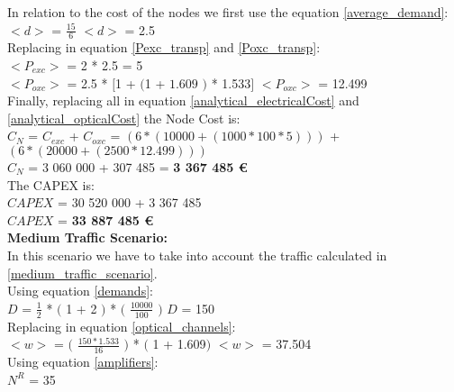 In relation to the cost of the nodes we first use the equation \ref{average_demand}:\\

$<d>$ = $\frac{15}{6}$ \qquad \qquad $<d>$ = 2.5\\

Replacing in equation \ref{Pexc_transp} and \ref{Poxc_transp}:\\

$<P_{exc}>$ = 2 * 2.5 = 5\\

$<P_{oxc}>$ = 2.5 * $[$1 + $($1 + $1.609$ $)$ * 1.533$]$ \qquad \quad $<P_{oxc}>$ = 12.499 \\

Finally, replacing all in equation \ref{analytical_electricalCost} and \ref{analytical_opticalCost} the Node Cost is:\\

$C_N$ = $C_{exc}$ + $C_{oxc}$ = $\left( 6*(10 000 + (1 000 * 100 * 5 ) ) \right)$ + $\left(6*(20 000 + (2 500 * 12.499 ) ) \right)$\\

$C_N$ = 3 060 000 + 307 485 = \textbf{3 367 485 \euro}\\

The CAPEX is:\\
$CAPEX$ = 30 520 000 + 3 367 485\\

$CAPEX$ = \textbf{33 887 485 \euro}\\


\textbf{Medium Traffic Scenario:}\\
In this scenario we have to take into account the traffic calculated in \ref{medium_traffic_scenario}.\\

Using equation \ref{demands}:\\

$D$ = $\frac{1}{2}$ * $($ 1 + 2 $)$ * $($ $\frac{10000}{100}$ $)$ \qquad \qquad $D$ = 150\\

Replacing in equation \ref{optical_channels}:\\

$<w>$ = $($ $\frac{150 * 1.533}{16}$ $)$ * $($ 1 + 1.609$)$ \qquad \qquad $<w>$ = 37.504\\

Using equation \ref{amplifiers}:\\

$N^R$ = 35\\

